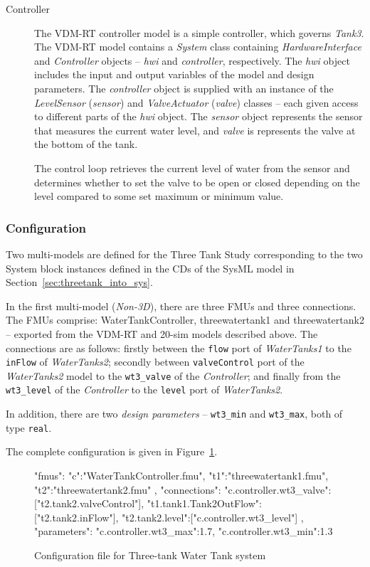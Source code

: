 \begin{description}
\item[Controller] The VDM-RT controller model is a simple controller, which governs \emph{Tank3}. The VDM-RT model contains a \emph{System} class containing \emph{HardwareInterface}  and \emph{Controller} objects -- \emph{hwi}  and \emph{controller}, respectively. The \emph{hwi} object includes the input and output variables of the model and design parameters. The \emph{controller} object is supplied with an instance of the \emph{LevelSensor}  (\emph{sensor}) and \emph{ValveActuator} (\emph{valve}) classes -- each given access to different parts of the \emph{hwi} object. The \emph{sensor} object represents the sensor that measures the current water level, and \emph{valve} is  represents the valve at the bottom of the tank.

The control loop retrieves the current level of water from the sensor and determines whether to set the valve to be open or closed depending on the level compared to some set maximum or minimum value. 
\end{description}

\subsubsection{Configuration}
\label{sec:threetank_into_mm}

Two multi-models are defined for the Three Tank Study corresponding to the two System block instances defined in the CDs of the SysML model in Section~\ref{sec:threetank_into_sys}. 

In the first multi-model (\emph{Non-3D}), there are three FMUs and three connections. The FMUs comprise: WaterTankController, threewatertank1 and threewatertank2 -- exported from the VDM-RT and 20-sim models described above. The connections are as follows: firstly between the \texttt{flow} port of \emph{WaterTanks1} to the \texttt{inFlow} of \emph{WaterTanks2}; secondly between \texttt{valveControl} port of the \emph{WaterTanks2} model to the \texttt{wt3\_valve} of the \emph{Controller}; and finally from the \texttt{wt3\_level} of the \emph{Controller} to the \texttt{level} port of \emph{WaterTanks2}. 

In addition, there are two \emph{design parameters} -- \texttt{wt3\_min} and \texttt{wt3\_max}, both of type \texttt{real}.

The complete configuration is given in Figure~\ref{fig:threetankconfig}.

\begin{figure}[htbp]
\begin{center}
\begin{config}
{		
	"fmus":{
		"{c}":"WaterTankController.fmu",
		"{t1}":"threewatertank1.fmu",
		"{t2}":"threewatertank2.fmu"
	},
	"connections":{
		"{c}.controller.wt3_valve":["{t2}.tank2.valveControl"],
		"{t1}.tank1.Tank2OutFlow":["{t2}.tank2.inFlow"],
		"{t2}.tank2.level":["{c}.controller.wt3_level"]
	},
	"parameters":{
		"{c}.controller.wt3_max":1.7,
		"{c}.controller.wt3_min":1.3
	}
}
\end{config}
\caption{Configuration file for Three-tank Water Tank system}
\label{fig:threetankconfig}
\end{center}
\end{figure}


